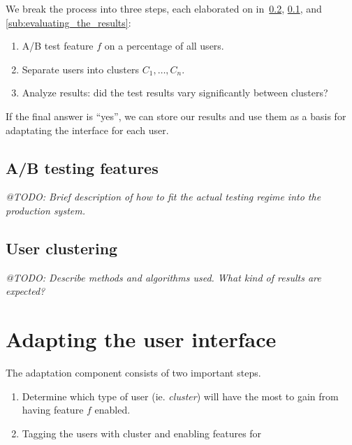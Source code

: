 We break the process into three steps, each elaborated on in~\ref{sub:clustering_of_users}, \ref{sub:a_b_testing_features}, and \ref{sub:evaluating_the_results}:

\begin{enumerate}
  \item A/B test feature $f$ on a percentage of all users.
  \item Separate users into clusters $C_1, \ldots, C_n$.
  \item Analyze results: did the test results vary significantly between clusters?
\end{enumerate}

If the final answer is ``yes'', we can store our results and use them as a basis for adaptating the interface for each user.

\subsection{A/B testing features} %
\label{sub:a_b_testing_features}

\emph{@TODO: Brief description of how to fit the actual testing regime into the production system.}


\subsection{User clustering} %
\label{sub:clustering_of_users}

\emph{@TODO: Describe methods and algorithms used. What kind of results are expected?}




\section{Adapting the user interface} %
\label{sec:adapting_the_user_interface}

The adaptation component consists of two important steps.

\begin{enumerate}
  \item Determine which type of user (ie. \emph{cluster}) will have the most to gain from having feature $f$ enabled.
  \item Tagging the users with cluster and enabling features for
\end{enumerate}

